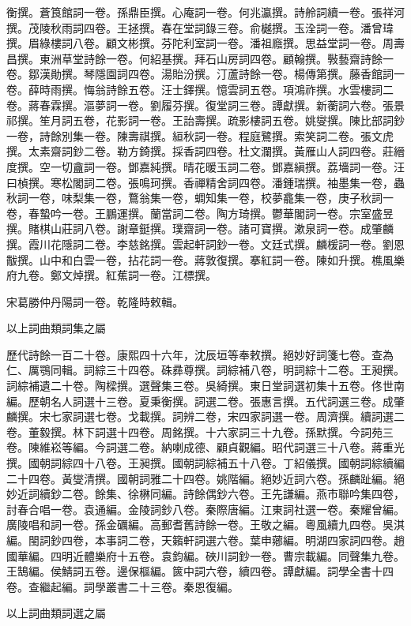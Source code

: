 \begin{pinyinscope}
衡撰。蒼筤館詞一卷。孫鼎臣撰。心庵詞一卷。何兆瀛撰。詩舲詞續一卷。張祥河撰。茂陵秋雨詞四卷。王拯撰。春在堂詞錄三卷。俞樾撰。玉洤詞一卷。潘曾瑋撰。眉綠樓詞八卷。顧文彬撰。芬陀利室詞一卷。潘祖廕撰。思益堂詞一卷。周壽昌撰。東洲草堂詩餘一卷。何紹基撰。拜石山房詞四卷。顧翰撰。斅藝齋詩餘一卷。鄒漢勛撰。琴隱園詞四卷。湯貽汾撰。汀蘆詩餘一卷。楊傳第撰。藤香館詞一卷。薛時雨撰。悔翁詩餘五卷。汪士鐸撰。憶雲詞五卷。項鴻祚撰。水雲樓詞二卷。蔣春霖撰。漚夢詞一卷。劉履芬撰。復堂詞三卷。譚獻撰。新蘅詞六卷。張景祁撰。笙月詞五卷，花影詞一卷。王詒壽撰。疏影樓詞五卷。姚燮撰。陳比部詞鈔一卷，詩餘別集一卷。陳壽祺撰。絙秋詞一卷。程庭鷺撰。索笑詞二卷。張文虎撰。太素齋詞鈔二卷。勒方錡撰。採香詞四卷。杜文瀾撰。黃雁山人詞四卷。莊縉度撰。空一切盦詞一卷。鄧嘉純撰。晴花暖玉詞二卷。鄧嘉縝撰。荔墻詞一卷。汪曰楨撰。寒松閣詞二卷。張鳴珂撰。香禪精舍詞四卷。潘鍾瑞撰。袖墨集一卷，蟲秋詞一卷，味梨集一卷，鶩翁集一卷，蜩知集一卷，校夢龕集一卷，庚子秋詞一卷，春蟄吟一卷。王鵬運撰。蘭當詞二卷。陶方琦撰。鬱華閣詞一卷。宗室盛昱撰。賭棋山莊詞八卷。謝章鋌撰。璞齋詞一卷。諸可寶撰。漱泉詞一卷。成肇麟撰。霞川花隱詞二卷。李慈銘撰。雲起軒詞鈔一卷。文廷式撰。麟楥詞一卷。劉恩黻撰。山中和白雲一卷，拈花詞一卷。蔣敦復撰。搴紅詞一卷。陳如升撰。樵風樂府九卷。鄭文焯撰。紅蕉詞一卷。江標撰。

宋葛勝仲丹陽詞一卷。乾隆時敕輯。

以上詞曲類詞集之屬

歷代詩餘一百二十卷。康熙四十六年，沈辰垣等奉敕撰。絕妙好詞箋七卷。查為仁、厲鶚同輯。詞綜三十四卷。硃彞尊撰。詞綜補八卷，明詞綜十二卷。王昶撰。詞綜補遺二十卷。陶樑撰。選聲集三卷。吳綺撰。東日堂詞選初集十五卷。佟世南編。歷朝名人詞選十三卷。夏秉衡撰。詞選二卷。張惠言撰。五代詞選三卷。成肇麟撰。宋七家詞選七卷。戈載撰。詞辨二卷，宋四家詞選一卷。周濟撰。續詞選二卷。董毅撰。林下詞選十四卷。周銘撰。十六家詞三十九卷。孫默撰。今詞苑三卷。陳維崧等編。今詞選二卷。納喇成德、顧貞觀編。昭代詞選三十八卷。蔣重光撰。國朝詞綜四十八卷。王昶撰。國朝詞綜補五十八卷。丁紹儀撰。國朝詞綜續編二十四卷。黃燮清撰。國朝詞雅二十四卷。姚階編。絕妙近詞六卷。孫麟趾編。絕妙近詞續鈔二卷。餘集、徐楙同編。詩餘偶鈔六卷。王先謙編。燕市聯吟集四卷，討春合唱一卷。袁通編。金陵詞鈔八卷。秦際唐編。江東詞社選一卷。秦耀曾編。廣陵唱和詞一卷。孫金礪編。高郵耆舊詩餘一卷。王敬之編。粵風續九四卷。吳淇編。閩詞鈔四卷，本事詞二卷，天籟軒詞選六卷。葉申薌編。明湖四家詞四卷。趙國華編。四明近體樂府十五卷。袁鈞編。硤川詞鈔一卷。曹宗載編。同聲集九卷。王鵠編。侯鯖詞五卷。邊保樞編。篋中詞六卷，續四卷。譚獻編。詞學全書十四卷。查繼起編。詞學叢書二十三卷。秦恩復編。

以上詞曲類詞選之屬


\end{pinyinscope}
